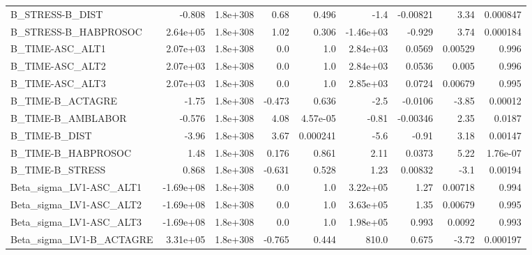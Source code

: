 \begin{tabular}{lrrrrrrrr}
B\_STRESS-B\_DIST                   &      -0.808 &     1.8e+308 &    0.68 &    0.496 &       -1.4 &    -0.00821 &         3.34 &      0.000847 \\
B\_STRESS-B\_HABPROSOC              &    2.64e+05 &     1.8e+308 &    1.02 &    0.306 &  -1.46e+03 &      -0.929 &         3.74 &      0.000184 \\
B\_TIME-ASC\_ALT1                   &    2.07e+03 &     1.8e+308 &     0.0 &      1.0 &   2.84e+03 &      0.0569 &      0.00529 &         0.996 \\
B\_TIME-ASC\_ALT2                   &    2.07e+03 &     1.8e+308 &     0.0 &      1.0 &   2.84e+03 &      0.0536 &        0.005 &         0.996 \\
B\_TIME-ASC\_ALT3                   &    2.07e+03 &     1.8e+308 &     0.0 &      1.0 &   2.85e+03 &      0.0724 &      0.00679 &         0.995 \\
B\_TIME-B\_ACTAGRE                  &       -1.75 &     1.8e+308 &  -0.473 &    0.636 &       -2.5 &     -0.0106 &        -3.85 &       0.00012 \\
B\_TIME-B\_AMBLABOR                 &      -0.576 &     1.8e+308 &    4.08 & 4.57e-05 &      -0.81 &    -0.00346 &         2.35 &        0.0187 \\
B\_TIME-B\_DIST                     &       -3.96 &     1.8e+308 &    3.67 & 0.000241 &       -5.6 &       -0.91 &         3.18 &       0.00147 \\
B\_TIME-B\_HABPROSOC                &        1.48 &     1.8e+308 &   0.176 &    0.861 &       2.11 &      0.0373 &         5.22 &      1.76e-07 \\
B\_TIME-B\_STRESS                   &       0.868 &     1.8e+308 &  -0.631 &    0.528 &       1.23 &     0.00832 &         -3.1 &       0.00194 \\
Beta\_sigma\_LV1-ASC\_ALT1           &   -1.69e+08 &     1.8e+308 &     0.0 &      1.0 &   3.22e+05 &        1.27 &      0.00718 &         0.994 \\
Beta\_sigma\_LV1-ASC\_ALT2           &   -1.69e+08 &     1.8e+308 &     0.0 &      1.0 &   3.63e+05 &        1.35 &      0.00679 &         0.995 \\
Beta\_sigma\_LV1-ASC\_ALT3           &   -1.69e+08 &     1.8e+308 &     0.0 &      1.0 &   1.98e+05 &       0.993 &       0.0092 &         0.993 \\
Beta\_sigma\_LV1-B\_ACTAGRE          &    3.31e+05 &     1.8e+308 &  -0.765 &    0.444 &      810.0 &       0.675 &        -3.72 &      0.000197 \\

\end{tabular}
